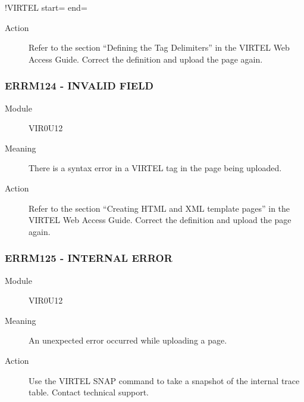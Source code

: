 \documentclass[letterpaper,10pt,english]{sphinxmanual}
\begin{document}
\begin{sphinxVerbatim}[commandchars=\\\{\}]
\PYGZlt{}!\PYGZhy{}\PYGZhy{}VIRTEL start=\PYGZdq{}\PYGZob{}\PYGZob{}\PYGZob{}\PYGZdq{} end=\PYGZdq{}\PYGZcb{}\PYGZcb{}\PYGZcb{}\PYGZdq{} \PYGZhy{}\PYGZhy{}\PYGZgt{}
\end{sphinxVerbatim}
\begin{description}
\item[{Action}] \leavevmode
Refer to the section “Defining the Tag Delimiters” in the VIRTEL Web Access Guide. Correct the definition and upload the page again.

\end{description}


\subsubsection{ERRM124 - INVALID FIELD}
\label{\detokenize{messages:errm124-invalid-field}}\begin{description}
\item[{Module}] \leavevmode
VIR0U12

\item[{Meaning}] \leavevmode
There is a syntax error in a VIRTEL tag in the page being uploaded.

\item[{Action}] \leavevmode
Refer to the section “Creating HTML and XML template pages” in the VIRTEL Web Access Guide. Correct the definition and upload the page again.

\end{description}


\subsubsection{ERRM125 - INTERNAL ERROR}
\label{\detokenize{messages:errm125-internal-error}}\begin{description}
\item[{Module}] \leavevmode
VIR0U12

\item[{Meaning}] \leavevmode
An unexpected error occurred while uploading a page.

\item[{Action}] \leavevmode
Use the VIRTEL SNAP command to take a snapshot of the internal trace table. Contact technical support.

\end{description}
\end{document}
